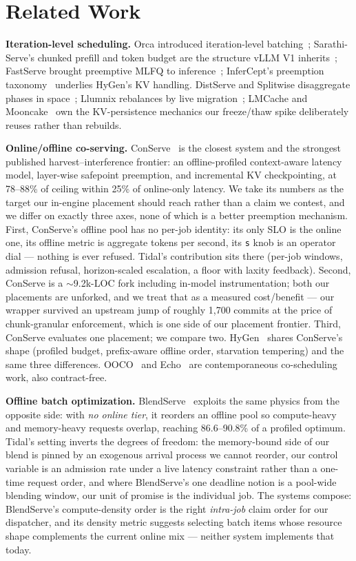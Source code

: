 \documentclass[11pt]{article}
\newcommand{\code}[1]{\texttt{#1}}
\begin{document}
\FloatBarrier
\section{Related Work}
\label{sec:related}

\textbf{Iteration-level scheduling.} Orca introduced iteration-level
batching~\citep{orca}; Sarathi-Serve's chunked prefill and token budget are the
structure vLLM V1 inherits~\citep{sarathi}; FastServe brought preemptive MLFQ to
inference~\citep{fastserve}; InferCept's preemption taxonomy~\citep{infercept} underlies
HyGen's KV handling. DistServe and Splitwise disaggregate phases in
space~\citep{distserve,splitwise}; Llumnix rebalances by live migration~\citep{llumnix};
LMCache and Mooncake~\citep{lmcache,mooncake} own the KV-persistence mechanics our
freeze/thaw spike deliberately reuses rather than rebuilds.

\textbf{Online/offline co-serving.} ConServe~\citep{conserve} is the closest system and
the strongest published harvest--interference frontier: an offline-profiled context-aware
latency model, layer-wise safepoint preemption, and incremental KV checkpointing, at
78--88\% of ceiling within 25\% of online-only latency. We take its numbers as the
target our in-engine placement should reach rather than a claim we contest, and we
differ on exactly three axes, none of which is a better preemption mechanism. First,
ConServe's offline pool has no per-job identity: its only SLO is the online one, its
offline metric is aggregate tokens per second, its \code{s} knob is an operator dial ---
nothing is ever refused. Tidal's contribution sits there (per-job windows, admission
refusal, horizon-scaled escalation, a floor with laxity feedback). Second, ConServe is a
$\sim$9.2k-LOC fork including in-model instrumentation; both our placements are
unforked, and we treat that as a measured cost/benefit --- our wrapper survived an
upstream jump of roughly 1{,}700 commits at the price of chunk-granular enforcement,
which is one side of our placement frontier. Third, ConServe evaluates one placement; we compare two.
HyGen~\citep{hygen} shares ConServe's shape (profiled budget, prefix-aware offline
order, starvation tempering) and the same three differences.
OOCO~\citep{ooco} and Echo~\citep{echo} are contemporaneous co-scheduling work, also
contract-free.

\textbf{Offline batch optimization.} BlendServe~\citep{blendserve} exploits the same
physics from the opposite side: with \emph{no online tier}, it reorders an offline pool
so compute-heavy and memory-heavy requests overlap, reaching 86.6--90.8\% of a profiled
optimum. Tidal's setting inverts the degrees of freedom: the memory-bound side of our
blend is pinned by an exogenous arrival process we cannot reorder, our control variable
is an admission rate under a live latency constraint rather than a one-time request
order, and where BlendServe's one deadline notion is a pool-wide blending window, our
unit of promise is the individual job. The systems compose: BlendServe's
compute-density order is the right \emph{intra-job} claim order for our dispatcher, and
its density metric suggests selecting batch items whose resource shape complements the
current online mix --- neither system implements that today.
\end{document}

